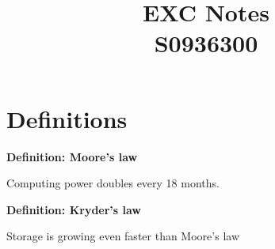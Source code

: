 \documentclass[11pt]{article}
\newcommand{\define}[2] {
  \textbf{Definition: #1}
  \begin{center} #2
\end{center}
}
\begin{document}
\title{EXC Notes \\ S0936300}

\section{Definitions}

\define{Moore's law}{Computing power doubles every 18 months.}
\define{Kryder's law}{Storage is growing even faster than Moore's law}

\maketitle
\end{document}
